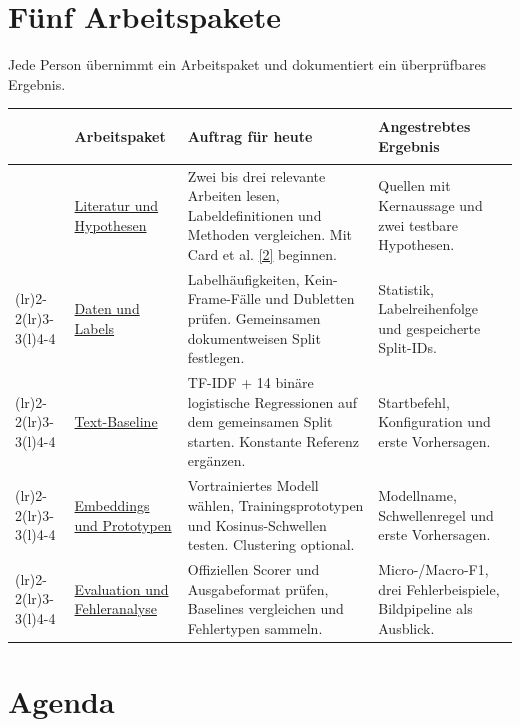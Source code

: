 \documentclass[10pt,a4paper]{article}
\renewcommand{\normalsize}{\fontsize{9.5}{12}\selectfont}
\newcommand{\checkbox}{\fbox{\rule{0pt}{2.4mm}\hspace{2.4mm}}}
\newcommand{\packagerule}{%
  \arrayrulecolor{black!20}%
  \cmidrule(lr){2-2}\cmidrule(lr){3-3}\cmidrule(l){4-4}%
  \arrayrulecolor{black}%
}
\begin{document}
\renewcommand{\theHsection}{work.\arabic{section}}
\setcounter{section}{0}
\section{Fünf Arbeitspakete}

Jede Person übernimmt ein Arbeitspaket und dokumentiert ein überprüfbares Ergebnis.

\vspace{0.35em}
\small

\begin{tabularx}{\linewidth}{@{}>{\centering\arraybackslash}p{0.95cm} >{\bfseries\raggedright\arraybackslash}p{2.75cm} >{\raggedright\arraybackslash}X >{\raggedright\arraybackslash}p{3.55cm}@{}}
\toprule
 & Arbeitspaket & Auftrag für heute & Angestrebtes Ergebnis \\
\midrule
\checkbox & \hyperlink{plan-literatur}{Literatur und Hypothesen} &
Zwei bis drei relevante Arbeiten lesen, Labeldefinitionen und Methoden vergleichen. Mit Card et al. \hyperlink{quelle-card}{[2]} beginnen. &
Quellen mit Kernaussage und zwei testbare Hypothesen. \\
\packagerule
\checkbox & \hyperlink{plan-daten}{Daten und Labels} &
Labelhäufigkeiten, Kein-Frame-Fälle und Dubletten prüfen. Gemeinsamen dokumentweisen Split festlegen. &
Statistik, Labelreihenfolge und gespeicherte Split-IDs. \\
\packagerule
\checkbox & \hyperlink{plan-text}{Text-Baseline} &
TF-IDF + 14 binäre logistische Regressionen auf dem gemeinsamen Split starten. Konstante Referenz ergänzen. &
Startbefehl, Konfiguration und erste Vorhersagen. \\
\packagerule
\checkbox & \hyperlink{plan-embeddings}{Embeddings und Prototypen} &
Vortrainiertes Modell wählen, Trainingsprototypen und Kosinus-Schwellen testen. Clustering optional. &
Modellname, Schwellenregel und erste Vorhersagen. \\
\packagerule
\checkbox & \hyperlink{plan-evaluation}{Evaluation und Fehleranalyse} &
Offiziellen Scorer und Ausgabeformat prüfen, Baselines vergleichen und Fehlertypen sammeln. &
Micro-/Macro-F1, drei Fehlerbeispiele, Bildpipeline als Ausblick. \\
\bottomrule
\end{tabularx}
\normalsize

\section{Agenda}
\end{document}
